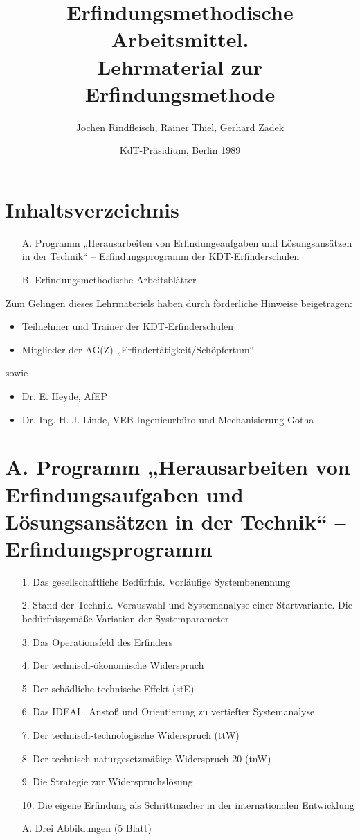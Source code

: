 \documentclass[11pt,a4paper]{article}
\title{Erfindungsmethodische Arbeitsmittel.\\ Lehrmaterial zur
Erfindungsmethode}
\author{Jochen Rindfleisch, Rainer Thiel, Gerhard Zadek}
\date{KdT-Präsidium, Berlin 1989}
\begin{document}
\maketitle

\section*{Inhaltsverzeichnis}                                   
\begin{itemize}
\item[A.] Programm „Herausarbeiten von Erfindungeaufgaben und Lösungsansätzen
  in der Technik“ -- Erfindungsprogramm der KDT-Erfinderschulen
\item [B.] Erfindungsmethodische Arbeitsblätter
\end{itemize}
Zum Gelingen dieses Lehrmateriels haben durch förderliche Hinweise
beigetragen:
\begin{itemize}[noitemsep]
\item Teilnehmer und Trainer der KDT-Erfinderschulen
\item Mitglieder der AG(Z) „Erfindertätigkeit/Schöpfertum“
\end{itemize}
sowie
\begin{itemize}[noitemsep]
\item Dr. E. Heyde, AfEP
\item Dr.-Ing. H.-J. Linde, VEB Ingenieurbüro und Mechanisierung Gotha
\end{itemize}
\newpage

\section*{A. Programm „Herausarbeiten von Erfindungsaufgaben und
Lösungsansätzen in der Technik“ -- Erfindungsprogramm}
\begin{itemize}
\item[1.] Das gesellschaftliche Bedürfnis. Vorläufige Systembenennung
\item[2.] Stand der Technik. Vorauswahl und Systemanalyse einer
Startvariante. Die bedürfnis\-gemäße Variation der Systemparameter
\item[3.] Das Operationsfeld des Erfinders
\item[4.] Der technisch-ökonomische Widerspruch
\item[5.] Der schädliche technische Effekt (stE)
\item[6.] Das IDEAL. Anstoß und Orientierung zu vertiefter Systemanalyse
\item[7.] Der technisch-technologische Widerspruch (ttW)
\item[8.] Der technisch-naturgesetzmäßige Widerspruch 20 (tnW)
\item[9.] Die Strategie zur Widerspruchslösung
\item[10.] Die eigene Erfindung als Schrittmacher in der internationalen
Entwicklung
\item[A.] Drei Abbildungen (5 Blatt)
\end{itemize}
\newpage
\end{document}
